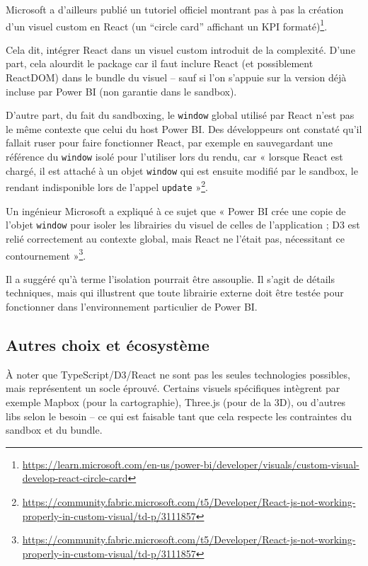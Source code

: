 Microsoft a d’ailleurs publié un tutoriel officiel montrant pas à pas la création d’un visuel custom en React (un “circle card” affichant un KPI formaté)\footnote{\url{https://learn.microsoft.com/en-us/power-bi/developer/visuals/custom-visual-develop-react-circle-card}}.

Cela dit, intégrer React dans un visuel custom introduit de la complexité. D’une part, cela alourdit le package car il faut inclure React (et possiblement ReactDOM) dans le bundle du visuel – sauf si l’on s’appuie sur la version déjà incluse par Power BI (non garantie dans le sandbox).

D’autre part, du fait du sandboxing, le \texttt{window} global utilisé par React n’est pas le même contexte que celui du host Power BI. Des développeurs ont constaté qu’il fallait ruser pour faire fonctionner React, par exemple en sauvegardant une référence du \texttt{window} isolé pour l’utiliser lors du rendu, car « lorsque React est chargé, il est attaché à un objet \texttt{window} qui est ensuite modifié par le sandbox, le rendant indisponible lors de l’appel \texttt{update} »\footnote{\url{https://community.fabric.microsoft.com/t5/Developer/React-js-not-working-properly-in-custom-visual/td-p/3111857}}.

Un ingénieur Microsoft a expliqué à ce sujet que « Power BI crée une copie de l’objet \texttt{window} pour isoler les librairies du visuel de celles de l’application ; D3 est relié correctement au contexte global, mais React ne l’était pas, nécessitant ce contournement »\footnote{\url{https://community.fabric.microsoft.com/t5/Developer/React-js-not-working-properly-in-custom-visual/td-p/3111857}}.

Il a suggéré qu’à terme l’isolation pourrait être assouplie. Il s’agit de détails techniques, mais qui illustrent que toute librairie externe doit être testée pour fonctionner dans l’environnement particulier de Power BI.

\subsection{Autres choix et écosystème}

À noter que TypeScript/D3/React ne sont pas les seules technologies possibles, mais représentent un socle éprouvé. Certains visuels spécifiques intègrent par exemple Mapbox (pour la cartographie), Three.js (pour de la 3D), ou d’autres libs selon le besoin – ce qui est faisable tant que cela respecte les contraintes du sandbox et du bundle.

